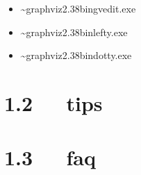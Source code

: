 \documentclass[letterpaper,12pt,english]{sphinxmanual}
\begin{document}
\begin{itemize}
\item {} 
\textasciitilde{}graphviz\sphinxhyphen{}2.38bingvedit.exe

\item {} 
\textasciitilde{}graphviz\sphinxhyphen{}2.38binlefty.exe

\item {} 
\textasciitilde{}graphviz\sphinxhyphen{}2.38bindotty.exe

\end{itemize}


\section{1.2   tips}
\label{\detokenize{001software/001install/Graphviz:tips}}

\section{1.3   faq}
\label{\detokenize{001software/001install/Graphviz:faq}}
\end{document}
